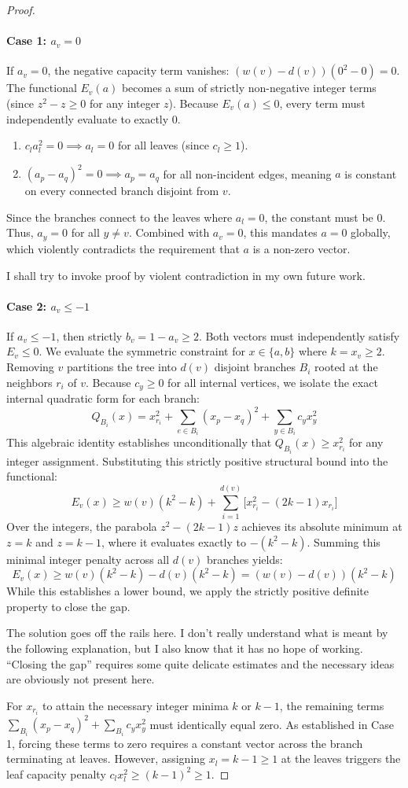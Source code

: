 \documentclass[12pt]{article}
\newcommand{\review}[1]{\begin{reviewbox}#1\end{reviewbox}}
\begin{document}
\begin{proof}
\paragraph{Case 1: $a_v = 0$} 
If $a_v = 0$, the negative capacity term vanishes: $(w(v) - d(v))(0^2 - 0) = 0$. 
The functional $E_v(a)$ becomes a sum of strictly non-negative integer terms (since $z^2 - z \ge 0$ for any integer $z$). 
Because $E_v(a) \le 0$, every term must independently evaluate to exactly $0$.
\begin{enumerate}
    \item $c_l a_l^2 = 0 \implies a_l = 0$ for all leaves (since $c_l \ge 1$).
    \item $(a_p - a_q)^2 = 0 \implies a_p = a_q$ for all non-incident edges, meaning $a$ is constant on every connected branch disjoint from $v$.
\end{enumerate}
Since the branches connect to the leaves where $a_l = 0$, the constant must be $0$. Thus, $a_y = 0$ for all $y \ne v$. 
Combined with $a_v = 0$, this mandates $a = 0$ globally, which violently contradicts the requirement that $a$ is a non-zero vector.
\review{I shall try to invoke proof by violent contradiction in my own future work.}

\paragraph{Case 2: $a_v \le -1$}
If $a_v \le -1$, then strictly $b_v = 1 - a_v \ge 2$. Both vectors must independently satisfy $E_v \le 0$. We evaluate the symmetric constraint for $x \in \{a, b\}$ where $k = x_v \ge 2$. 
Removing $v$ partitions the tree into $d(v)$ disjoint branches $B_i$ rooted at the neighbors $r_i$ of $v$. Because $c_y \ge 0$ for all internal vertices, we isolate the exact internal quadratic form for each branch:
\[
Q_{B_i}(x) = x_{r_i}^2 + \sum_{e \in B_i} (x_p - x_q)^2 + \sum_{y \in B_i} c_y x_y^2
\]
This algebraic identity establishes unconditionally that $Q_{B_i}(x) \ge x_{r_i}^2$ for any integer assignment. 
Substituting this strictly positive structural bound into the functional:
\[
E_v(x) \ge w(v)(k^2 - k) + \sum_{i=1}^{d(v)} \big[ x_{r_i}^2 - (2k-1)x_{r_i} \big]
\]
Over the integers, the parabola $z^2 - (2k-1)z$ achieves its absolute minimum at $z = k$ and $z = k-1$, where it evaluates exactly to $-(k^2 - k)$. 
Summing this minimal integer penalty across all $d(v)$ branches yields:
\[
E_v(x) \ge w(v)(k^2 - k) - d(v)(k^2 - k) = (w(v) - d(v))(k^2 - k)
\]
While this establishes a lower bound, we apply the strictly positive definite property to close the gap.
\review{The solution goes off the rails here. I don't really understand what is meant by the following explanation, but I also know that it has no hope of working. ``Closing the gap'' requires some quite delicate estimates and the necessary ideas are obviously not present here.}
For $x_{r_i}$ to attain the necessary integer minima $k$ or $k-1$, the remaining terms $\sum_{B_i} (x_p - x_q)^2 + \sum_{B_i} c_y x_y^2$ must identically equal zero. As established in Case 1, forcing these terms to zero requires a constant vector across the branch terminating at leaves. However, assigning $x_l = k-1 \ge 1$ at the leaves triggers the leaf capacity penalty $c_l x_l^2 \ge (k-1)^2 \ge 1$. 


\end{proof}
\end{document}
